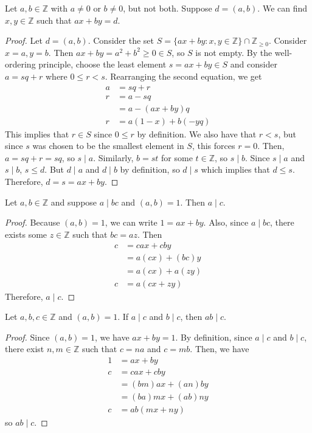 \documentclass [12pt] {article}
\newcommand{\Z}{\mathbb{Z}}
\newenvironment{theorem}[1]{\begin{tcolorbox}[title={Theorem #1},colback=green!5!white,colframe=black!75!green]}{\end{tcolorbox}}
\newenvironment{corollary}[1]{\begin{tcolorbox}[title={Corollary #1}]}{\end{tcolorbox}}
\begin{document}
\begin{theorem}{(Bezout's Identity)}
    Let $a, b \in \Z$ with $a \neq 0$ or $b \neq 0$, but not both. Suppose $d = (a, b)$. We can find
    $x, y \in \Z$ such that $ax + by = d$.
\end{theorem}
\begin{proof}
    Let $d = (a, b)$. Consider the set $S = \{ ax + by : x, y \in \Z\} \cap \Z_{\geq 0}$. Consider
    $x = a, y = b$. Then $ax + by = a^2 + b^2 \geq 0 \in S$, so $S$ is not empty. By the
    well-ordering principle, choose the least element $s = ax + by \in S$ and consider $a = sq + r$
    where $0 \leq r < s$. Rearranging the second equation, we get
    \begin{align*}
        a &= sq + r \\
        r &= a - sq \\
          &= a - (ax + by)q \\
        r &= a(1 - x) + b(-yq)
    \end{align*}
    This implies that $r \in S$ since $0 \leq r$ by definition. We also have that $r < s$, but since
    $s$ was chosen to be the smallest element in $S$, this forces $r = 0$. Then, $a = sq + r = sq$,
    so $s \mid a$. Similarly, $b = st$ for some $t \in \Z$, so $s \mid b$. Since $s \mid a$ and $s \mid b$,  $s
    \leq d$. But $d \mid a$ and $d \mid b$ by definition, so $d \mid s$ which implies that $d \leq s$.
    Therefore, $d = s = ax + by$.
\end{proof}

\begin{theorem}{}
    Let $a, b \in \Z$ and suppose $a \mid bc$ and $(a, b) = 1$. Then $a \mid c$.
\end{theorem}
\begin{proof}
    Because $(a, b) = 1$, we can write $1 = ax + by$. Also, since $a \mid bc$, there exists some 
    $z \in \Z$ such that $bc = az$. Then 
    \begin{align*}
        c &= cax + cby \\
          &= a(cx) + (bc)y \\ 
          &= a(cx) + a(zy) \\ 
        c &= a(cx + zy)
    \end{align*}
    Therefore, $a \mid c$.
\end{proof}

\newpage
\begin{corollary}{}
    Let $a, b, c \in \Z$ and $(a, b) = 1$. If $a \mid c$ and $b \mid c$, then $ab \mid c$.
\end{corollary}
\begin{proof}
    Since $(a, b) = 1$, we have $ax + by = 1$. By definition, since $a \mid c$ and $b \mid c$, there exist
    $n, m \in \Z$ such that $c = na$ and $c = mb$. Then, we have
    \begin{align*}
        1 &= ax + by \\ 
        c &= cax + cby \\ 
          &= (bm)ax + (an)by \\ 
          &= (ba)mx + (ab)ny \\ 
        c &= ab(mx + ny) 
    \end{align*}
    so $ab \mid c$.
\end{proof}
\end{document}
